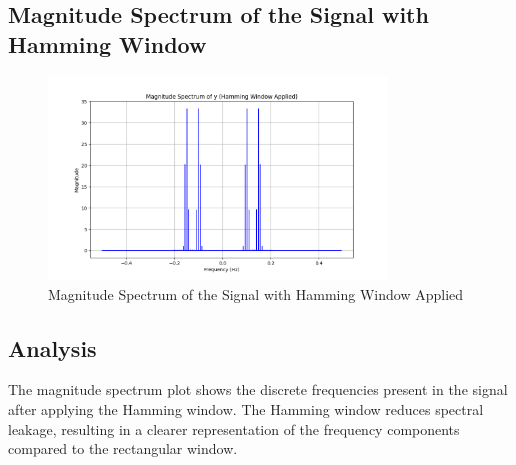 \subsection*{Magnitude Spectrum of the Signal with Hamming Window}
\begin{figure}[h]
    \centering
    \includegraphics[width=0.8\textwidth]{fig/ex5_b_magnitude_spectrum_hamming.png}
    \caption{Magnitude Spectrum of the Signal with Hamming Window Applied}
    \label{fig:ex5_b_magnitude_spectrum_hamming}
\end{figure}

\subsection*{Analysis}
The magnitude spectrum plot shows the discrete frequencies present in the signal after applying the Hamming window. The Hamming window reduces spectral leakage, resulting in a clearer representation of the frequency components compared to the rectangular window.
